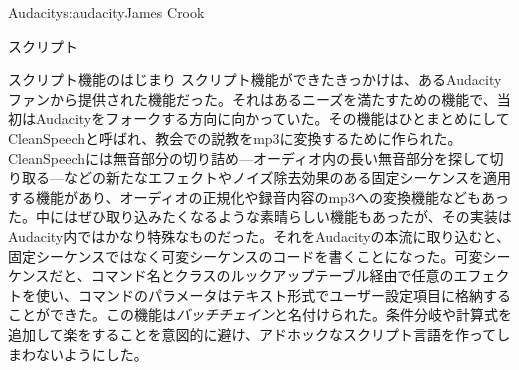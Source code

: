 \begin{aosachapter}{Audacity}{s:audacity}{James Crook}
\begin{aosasect1}{スクリプト}
\begin{aosabox}{スクリプト機能のはじまり}
スクリプト機能ができたきっかけは、あるAudacityファンから提供された機能だった。それはあるニーズを満たすための機能で、当初はAudacityをフォークする方向に向かっていた。その機能はひとまとめにしてCleanSpeechと呼ばれ、教会での説教をmp3に変換するために作られた。CleanSpeechには無音部分の切り詰め---オーディオ内の長い無音部分を探して切り取る---などの新たなエフェクトやノイズ除去効果のある固定シーケンスを適用する機能があり、オーディオの正規化や録音内容のmp3への変換機能などもあった。中にはぜひ取り込みたくなるような素晴らしい機能もあったが、その実装はAudacity内ではかなり特殊なものだった。それをAudacityの本流に取り込むと、固定シーケンスではなく可変シーケンスのコードを書くことになった。可変シーケンスだと、コマンド名とクラスのルックアップテーブル経由で任意のエフェクトを使い、コマンドのパラメータはテキスト形式でユーザー設定項目に格納することができた。この機能は\emph{バッチチェイン}と名付けられた。条件分岐や計算式を追加して楽をすることを意図的に避け、アドホックなスクリプト言語を作ってしまわないようにした。


\end{aosabox}
\end{aosasect1}
\end{aosachapter}
